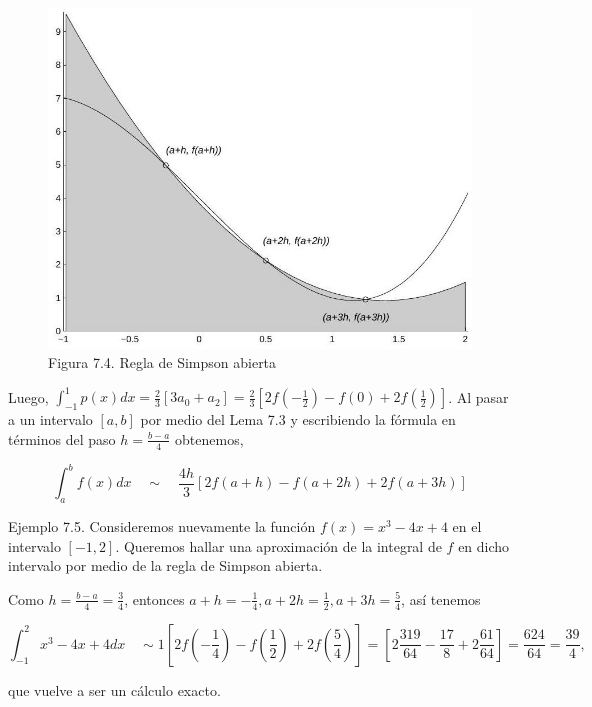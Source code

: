 \documentclass[10pt]{article}
\begin{document}
\begin{figure}[h]
\begin{center}
  \includegraphics[width=\textwidth]{2025_09_05_3888c9ac96bd653d96b4g-144}
\captionsetup{labelformat=empty}
\caption{Figura 7.4. Regla de Simpson abierta}
\end{center}
\end{figure}

Luego, $\int_{-1}^{1} p(x) d x=\frac{2}{3}\left[3 a_{0}+a_{2}\right]=\frac{2}{3}\left[2 f\left(-\frac{1}{2}\right)-f(0)+2 f\left(\frac{1}{2}\right)\right]$. Al pasar a un intervalo $[a, b]$ por medio del Lema 7.3 y escribiendo la fórmula en términos del paso $h=\frac{b-a}{4}$ obtenemos,

$$
\int_{a}^{b} f(x) d x \quad \sim \quad \frac{4 h}{3}[2 f(a+h)-f(a+2 h)+2 f(a+3 h)]
$$

Ejemplo 7.5. Consideremos nuevamente la función $f(x)=x^{3}-4 x+4$ en el intervalo $[-1,2]$. Queremos hallar una aproximación de la integral de $f$ en dicho intervalo por medio de la regla de Simpson abierta.

Como $h=\frac{b-a}{4}=\frac{3}{4}$, entonces $a+h=-\frac{1}{4}, a+2 h=\frac{1}{2}, a+3 h=\frac{5}{4}$, así tenemos

$$
\int_{-1}^{2} x^{3}-4 x+4 d x \quad \sim 1\left[2 f\left(-\frac{1}{4}\right)-f\left(\frac{1}{2}\right)+2 f\left(\frac{5}{4}\right)\right]=\left[2 \frac{319}{64}-\frac{17}{8}+2 \frac{61}{64}\right]=\frac{624}{64}=\frac{39}{4},
$$

que vuelve a ser un cálculo exacto.
\end{document}
